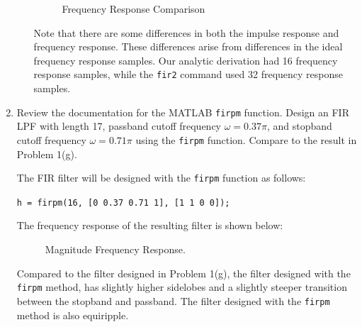 \documentclass[fleqn]{article}
\begin{document}
\begin{enumerate}
\begin{enumerate}[nolistsep]
			\begin{figure}[H]
				\centerline{}
				\caption{Frequency Response Comparison}
			\end{figure}
			
			Note that there are some differences in both the impulse response and frequency response. These differences arise from differences in the ideal frequency response samples. Our analytic derivation had 16 frequency response samples, while the \texttt{fir2} command used 32 frequency response samples.
		\end{enumerate}
		
		\item Review the documentation for the MATLAB 
		\texttt{firpm} function. Design an FIR LPF with length 17, passband cutoff frequency $\omega = 0.37\pi$, and stopband cutoff frequency $\omega = 0.71\pi$ using the \texttt{firpm} function. Compare to the result in Problem 1(g).
		
		\pagebreak
		The FIR filter will be designed with the \texttt{firpm} function as follows:
		
		\texttt{h = firpm(16, [0 0.37 0.71 1], [1 1 0 0]);}
		
		The frequency response of the resulting filter is shown below:
		
		\begin{figure}[H]
			\centerline{}
			\caption{Magnitude Frequency Response.}
		\end{figure}
		
		Compared to the filter designed in Problem 1(g), the filter designed with the \texttt{firpm} method, has slightly higher sidelobes and a slightly steeper transition between the stopband and passband. The filter designed with the \texttt{firpm} method is also equiripple.
	\end{enumerate}	
\end{document}
